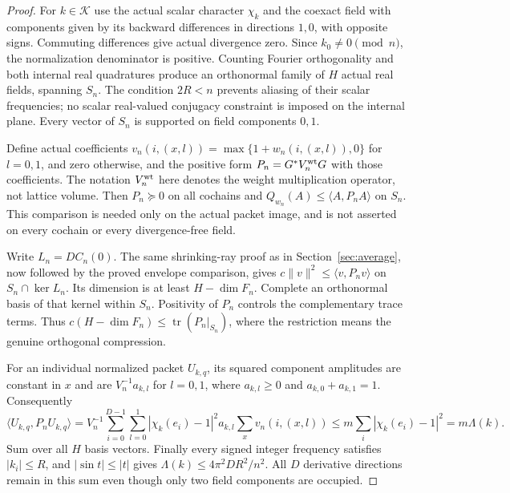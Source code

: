 \begin{proof}
For $k\in\mathcal K$ use the actual scalar character $\chi_k$ and the
coexact field with components given by its backward differences in
directions $1,0$, with opposite signs. Commuting differences give actual
divergence zero. Since $k_0\neq0\pmod n$, the normalization denominator is
positive. Counting Fourier orthogonality and both internal real quadratures
produce an orthonormal family of $H$ actual real fields, spanning $S_n$.
The condition $2R<n$ prevents aliasing of their scalar frequencies; no
scalar real-valued conjugacy constraint is imposed on the internal plane.
Every vector of $S_n$ is supported on field components $0,1$.

Define actual coefficients $v_n(i,(x,l))=\max\{1+w_n(i,(x,l)),0\}$ for
$l=0,1$, and zero otherwise, and the positive form $P_n=G^*V_n^{\rm wt}G$
with those coefficients. The notation $V_n^{\rm wt}$ here denotes the
weight multiplication operator, not lattice volume. Then $P_n\succeq0$
on all cochains and $Q_{w_n}(A)\leq\langle A,P_nA\rangle$ on $S_n$.
This comparison is needed only on the actual packet image, and is not
asserted on every cochain or every divergence-free field.

Write $L_n=DC_n(0)$. The same shrinking-ray proof as in
Section~\ref{sec:average}, now followed by the proved envelope comparison,
gives $c\|v\|^2\leq\langle v,P_nv\rangle$ on $S_n\cap\ker L_n$.
Its dimension is at least $H-\dim F_n$. Complete an orthonormal basis of
that kernel within $S_n$. Positivity of $P_n$ controls the complementary
trace terms. Thus $c(H-\dim F_n)\leq\operatorname{tr}(P_n|_{S_n})$, where
the restriction means the genuine orthogonal compression.

For an individual normalized packet $U_{k,q}$, its squared component
amplitudes are constant in $x$ and are $V_n^{-1}a_{k,l}$ for $l=0,1$,
where $a_{k,l}\geq0$ and $a_{k,0}+a_{k,1}=1$. Consequently
\[
 \langle U_{k,q},P_nU_{k,q}\rangle
 =V_n^{-1}\sum_{i=0}^{D-1}\sum_{l=0}^{1}
   |\chi_k(e_i)-1|^2 a_{k,l}\sum_x v_n(i,(x,l))
 \leq m\sum_i|\chi_k(e_i)-1|^2=m\Lambda(k).
\]
Sum over all $H$ basis vectors. Finally every signed integer frequency
satisfies $|k_i|\leq R$, and $|\sin t|\leq|t|$ gives
$\Lambda(k)\leq4\pi^2DR^2/n^2$. All $D$ derivative directions remain in
this sum even though only two field components are occupied.
\end{proof}

